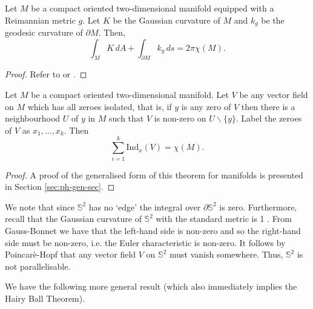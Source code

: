 \documentclass[12pt,a4paper]{article}
\begin{document}
\begin{theorem}
Let $M$ be a compact oriented two-dimensional manifold equipped with a Reimannian metric $g$. Let $K$ be the Gaussian curvature of $M$ and $k_g$ be the geodesic curvature of $\partial M$. Then,
\[
\int_MK\,dA+\int_{\partial M}k_g\,ds=2\pi\chi(M).
\] 
\end{theorem}
\begin{proof}
Refer to \cite{andrews} or \cite{guillemin2010differential}.
\end{proof}
\begin{theorem}
Let $M$ be a compact oriented two-dimensional manifold. Let $V$ be any vector field on $M$ which has all zeroes isolated, that is, if $y$ is any zero of $V$ then there is a neighbourhood $U$ of $y$ in $M$ such that $V$ is non-zero on $U\backslash\{y\}$. Label the zeroes of $V$ as $x_1,\ldots,x_k$. Then 
\[\sum_{i=1}^{k}\mathrm{Ind}_x(V)=\chi(M).\]
\label{thm:poinhopf}
\end{theorem}
\begin{proof}
A proof of the generalised form of this theorem for manifolds is presented in Section \ref{sec:ph-gen-sec}.
\end{proof}
%
\begin{remark}
We note that since $\mathbb{S}^2$ has no `edge' the integral over $\partial\mathbb{S}^2$ is zero. Furthermore, recall that the Gaussian curvature of $\mathbb{S}^2$ with the standard metric is 1 \cite{andrews}. From Gauss-Bonnet we have that the left-hand side is non-zero and so the right-hand side must be non-zero, i.e. the Euler characteristic is non-zero. It follows by Poincar\`{e}-Hopf that any vector field $V$ on $\mathbb{S}^2$ must vanish somewhere. Thus, $\mathbb{S}^2$ is not parallelisable. 
\end{remark} 
We have the following more general result (which also immediately implies the Hairy Ball Theorem).
\end{document}
